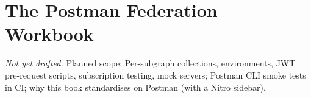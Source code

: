 \chapter{The Postman Federation Workbook}
\label{ch:the-postman-federation-workbook}

\emph{Not yet drafted.} Planned scope: Per-subgraph collections, environments, JWT pre-request scripts, subscription testing, mock servers; Postman CLI smoke tests in CI; why this book standardises on Postman (with a Nitro sidebar).

% 

